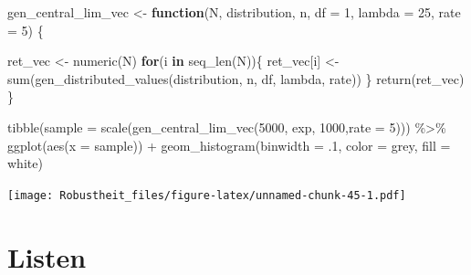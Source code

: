 \documentclass[
]{book}
\newenvironment{Shaded}{\begin{snugshade}}{\end{snugshade}}
\newcommand{\AttributeTok}[1]{\textcolor[rgb]{0.77,0.63,0.00}{#1}}
\newcommand{\ControlFlowTok}[1]{\textcolor[rgb]{0.13,0.29,0.53}{\textbf{#1}}}
\newcommand{\DecValTok}[1]{\textcolor[rgb]{0.00,0.00,0.81}{#1}}
\newcommand{\FunctionTok}[1]{\textcolor[rgb]{0.00,0.00,0.00}{#1}}
\newcommand{\NormalTok}[1]{#1}
\newcommand{\OtherTok}[1]{\textcolor[rgb]{0.56,0.35,0.01}{#1}}
\newcommand{\SpecialCharTok}[1]{\textcolor[rgb]{0.00,0.00,0.00}{#1}}
\newcommand{\StringTok}[1]{\textcolor[rgb]{0.31,0.60,0.02}{#1}}
\begin{document}
\begin{Shaded}
\begin{Highlighting}[]
\NormalTok{gen\_central\_lim\_vec }\OtherTok{\textless{}{-}} \ControlFlowTok{function}\NormalTok{(N, }
\NormalTok{                                distribution,}
\NormalTok{                                n,}
                                \AttributeTok{df =} \DecValTok{1}\NormalTok{,}
                                \AttributeTok{lambda =} \DecValTok{25}\NormalTok{,}
                                \AttributeTok{rate =} \DecValTok{5}\NormalTok{) \{}
  
\NormalTok{  ret\_vec }\OtherTok{\textless{}{-}} \FunctionTok{numeric}\NormalTok{(N)}
  \ControlFlowTok{for}\NormalTok{(i }\ControlFlowTok{in} \FunctionTok{seq\_len}\NormalTok{(N))\{}
\NormalTok{    ret\_vec[i] }\OtherTok{\textless{}{-}} \FunctionTok{sum}\NormalTok{(}\FunctionTok{gen\_distributed\_values}\NormalTok{(distribution,}
\NormalTok{                                      n,}
\NormalTok{                                      df,}
\NormalTok{                                      lambda,}
\NormalTok{                                      rate))}
\NormalTok{  \}}
  \FunctionTok{return}\NormalTok{(ret\_vec)}
\NormalTok{\}}

\FunctionTok{tibble}\NormalTok{(}\AttributeTok{sample =} \FunctionTok{scale}\NormalTok{(}\FunctionTok{gen\_central\_lim\_vec}\NormalTok{(}\DecValTok{5000}\NormalTok{, }\StringTok{\textquotesingle{}exp\textquotesingle{}}\NormalTok{, }\DecValTok{1000}\NormalTok{,}\AttributeTok{rate =} \DecValTok{5}\NormalTok{))) }\SpecialCharTok{\%\textgreater{}\%} 
  \FunctionTok{ggplot}\NormalTok{(}\FunctionTok{aes}\NormalTok{(}\AttributeTok{x =}\NormalTok{ sample)) }\SpecialCharTok{+}
  \FunctionTok{geom\_histogram}\NormalTok{(}\AttributeTok{binwidth =}\NormalTok{ .}\DecValTok{1}\NormalTok{,}
                 \AttributeTok{color =} \StringTok{\textquotesingle{}grey\textquotesingle{}}\NormalTok{,}
                 \AttributeTok{fill =} \StringTok{\textquotesingle{}white\textquotesingle{}}\NormalTok{)}
\end{Highlighting}
\end{Shaded}

\texttt{[image: Robustheit\_files/figure-latex/unnamed-chunk-45-1.pdf]}

\hypertarget{listen}{%
\chapter{Listen}\label{listen}}
\end{document}
